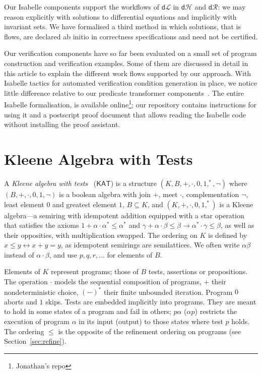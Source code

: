 \documentclass[envcountsame]{llncs}
\newcommand{\KAT}{\mathsf{KAT}}
\newcommand{\dL}{\mathsf{d}\mathcal{L}}
\newcommand{\dH}{\mathsf{d}\mathcal{H}}
\newcommand{\dR}{\mathsf{d}\mathcal{R}}
\begin{document}
Our Isabelle components support the  workflows of $\dL$ in $\dH$
and $\dR$: we may reason explicitly with solutions to differential
equations and implicitly with invariant sets. We have formalised a third
method in which solutions, that is flows, are declared ab initio in
correctness specifications and need not be certified.

Our verification components have so far been evaluated on a small set of
program construction and verification examples. Some of them are
discussed in detail in this article to explain the different work
flows supported by our approach. With Isabelle tactics for automated
verification condition generation in place, we notice little
difference relative to our predicate transformer
components~\cite{MuniveS19}.  The entire Isabelle formalisation, is
available online\footnote{Jonathan's repo}; our repository contains
instructions for using it and a postscript proof document that allows
reading the Isabelle code without installing the proof assistant.



\section{Kleene Algebra with Tests}\label{sec:kat} 

A \emph{Kleene algebra with tests}~\cite{Kozen97} ($\KAT$) is a
structure $(K,B,+,\cdot,0,1,^\ast,\neg)$ where $(B,+,\cdot,0,1,\neg)$
is a boolean algebra with join $+$, meet $\cdot$, complementation
$\neg$, least element $0$ and greatest element $1$, $B\subseteq K$,
and $(K,+,\cdot,0,1,^\ast)$ is a Kleene algebra---a semiring with
idempotent addition equipped with a star operation that satisfies the
axioms $1+\alpha\cdot\alpha^\ast \le \alpha^\ast$ and
$\gamma+\alpha\cdot \beta\le \beta\rightarrow \alpha^\ast \cdot
\gamma\le \beta$,
as well as their opposities, with multiplication swapped.  The
ordering on $K$ is defined by $x\le y\leftrightarrow x+y=y$, as
idempotent semirings are semilattices. We often write $\alpha\beta$
instead of $\alpha\cdot\beta$, and use $p,q,r,\dots$ for elements of $B$.

Elements of $K$ represent programs; those of $B$ tests, assertions or
propositions.  The operation $\cdot$ models the sequential composition
of programs, $+$ their nondeterministic choice, $(-)^\ast$ their
finite unbounded iteration. Program $0$ aborts and $1$ skips.  Tests
are embedded implicitly into programs. They are meant to hold in some
states of a program and fail in others; $p\alpha$ ($\alpha p$)
restricts the execution of program $\alpha$ in its input (output) to
those states where test $p$ holds. The ordering $\le$ is the opposite
of the refinement ordering on programs (see Section~\ref{sec:refine}).
\end{document}
